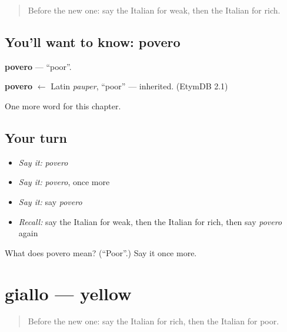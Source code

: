 \label{lesson:IT-C76-povero}



\begin{quote}
Before the new one: say the Italian for weak, then the Italian for rich.
\end{quote}

\subsection*{You'll want to know: povero}
\textbf{povero} — \textquotedblleft{}poor\textquotedblright{}.

\begin{cousinweb}
\textbf{povero} $\leftarrow$ Latin \emph{pauper}, \textquotedblleft{}poor\textquotedblright{} — inherited. (EtymDB 2.1)
\end{cousinweb}

\begin{grammarlens}[title={What you've built}]
One more word for this chapter.
\end{grammarlens}

\subsection*{Your turn}
\begin{itemize}
\raggedright
  \item \emph{Say it:} \emph{povero}
  \item \emph{Say it:} \emph{povero}, once more
  \item \emph{Say it:} say \emph{povero}
  \item \emph{Recall:} say the Italian for weak, then the Italian for rich, then say \emph{povero} again
\end{itemize}

\begin{tcolorbox}[breakable,colback=teal!4,colframe=teal!35!black,title={Before you move on}]
What does povero mean? (\textquotedblleft{}Poor\textquotedblright{}.) Say it once more.
\end{tcolorbox}
\section[giallo]{giallo — yellow}

\label{lesson:IT-C76-giallo}



\begin{quote}
Before the new one: say the Italian for rich, then the Italian for poor.
\end{quote}

